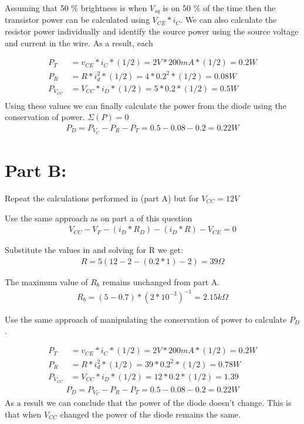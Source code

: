 \documentclass{article}
\begin{document}
Assuming that 50 \% brightness is when $V_{sq}$ is on 50 \% of the time then the transistor power can be calculated using $V_{CE} * i_C$. We can also calculate the resistor power individually and identify the source power using the source voltage and current in the wire. As a result, each 

\begin{align*}
    P_T &= v_{CE} *i_C * (1/2) =2V * 200 mA *(1/2) = 0.2 W \\
    P_R &= R*i_d^2 * (1/2) = 4 * 0.2^2 * (1/2) = 0.08 W \\
    P_{V_{CC}} &= V_{CC} * i_D * (1/2) = 5 * 0.2 * (1/2) = 0.5W \\
\end{align*}
Using these values we can finally calculate the power from the diode using the conservation of power. $\Sigma (P) = 0$
\begin{align}        
    P_D = P_{V_{C}} - P_R - P_T = 0.5 - 0.08 - 0.2 = 0.22W
\end{align}

\section*{Part B:}
Repeat the calculations performed in (part A) but for $V_{CC} = 12V$

Use the same approach as on part a of this question
\begin{align*}
    V_{CC} - V_F - (i_D*R_D) - (i_D * R) - V_{CE} = 0
\end{align*}

Substitute the values in and solving for R we get:
\begin{align}
    R = 5 (12-2-(0.2*1)-2) = 39\Omega
\end{align}

The maximum value of $R_b$ remains unchanged from part A.
\begin{align}
    R_b = (5 - 0.7)*(2*10^{-3})^{-1} = 2.15 k\Omega
\end{align}

Use the same approach of manipulating the conservation of power to calculate $P_D$.

\begin{align*}
    P_T &= v_{CE} *i_C * (1/2) =2V * 200 mA *(1/2) = 0.2 W \\
    P_R &= R*i_d^2 * (1/2) = 39* 0.2^2 * (1/2) = 0.78 W \\
    P_{V_{CC}} &= V_{CC} * i_D * (1/2) = 12 * 0.2 * (1/2) = 1.39
\end{align*}
\begin{align}        
    P_D = P_{V_{C}} - P_R - P_T = 0.5 - 0.08 - 0.2 = 0.22W
\end{align}
As a result we can conclude that the power of the diode doesn't change. This is that when $V_{CC}$ changed the power of the diode remains the same.
\end{document}
